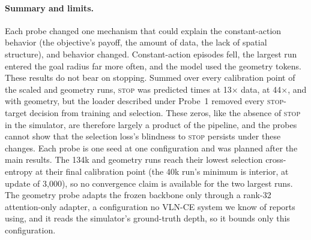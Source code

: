 \paragraph{Summary and limits.}
Each probe changed one mechanism that could explain the constant-action behavior (the objective's
payoff, the amount of data, the lack of spatial structure), and behavior changed. Constant-action
episodes fell, the largest run entered the goal radius far more often, and the model used the
geometry tokens. These results do not bear on stopping. Summed over every calibration point of the
scaled and geometry runs, \textsc{stop} was predicted \PrFortyStopTot{} times at 13$\times$ data,
\PrBigStopTot{} at 44$\times$, and \PrGeoStopTot{} with geometry, but the loader described under
Probe~1 removed every \textsc{stop}-target decision from training and selection. These zeros, like
the absence of \textsc{stop} in the simulator, are therefore largely a product of the pipeline, and
the probes cannot show that the selection loss's blindness to \textsc{stop} persists under these
changes. Each probe is one seed at one configuration and was planned after the main results. The
134k and geometry runs reach their lowest selection cross-entropy at their final calibration point
(the 40k run's minimum is interior, at update \PrFortyMinU{} of 3{,}000), so no convergence claim is
available for the two largest runs. The geometry probe adapts the frozen backbone only through a
rank-32 attention-only adapter, a configuration no VLN-CE system we know of reports using, and it
reads the simulator's ground-truth depth, so it bounds only this configuration.
